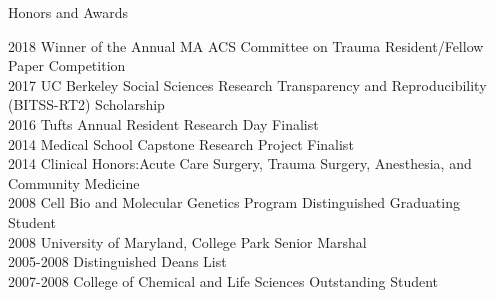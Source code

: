 \documentclass{resume} %
\begin{document}
\begin{rSection}{Honors and Awards}

   2018 \hspace{27.5pt} Winner of the Annual MA ACS Committee on Trauma Resident/Fellow Paper Competition\\
   2017 \hspace{27.5pt} UC Berkeley Social Sciences Research Transparency and Reproducibility (BITSS-RT2) Scholarship \\
   2016 \hspace{27.5pt} Tufts Annual Resident Research Day Finalist\\
   2014 \hspace{27.5pt} Medical School Capstone Research Project Finalist \\
   2014 \hspace{27.5pt} Clinical Honors:Acute Care Surgery, Trauma Surgery, Anesthesia, and Community Medicine \\
   2008 \hspace{27.5pt} Cell Bio and Molecular Genetics Program Distinguished Graduating Student\\
   2008 \hspace{27.5pt} University of Maryland, College Park Senior Marshal \\
   2005-2008 \enspace Distinguished Deans List \\
   2007-2008 \enspace  College of Chemical and Life Sciences Outstanding Student
   
   \end{rSection}
   

\end{document}
